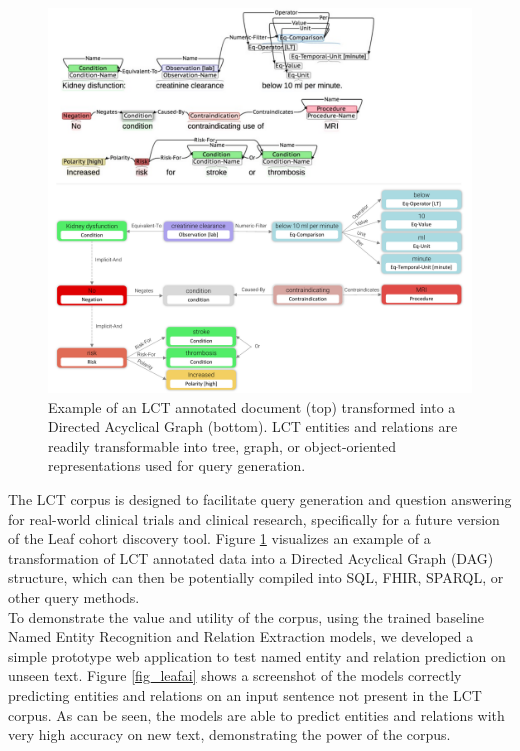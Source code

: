 \documentclass[fleqn,10pt]{wlscirep}
\begin{document}
\begin{figure}[p]
\centering
  \includegraphics[scale=0.64]{dag.pdf}  
\caption{Example of an LCT annotated document (top) transformed into a Directed Acyclical Graph (bottom). LCT entities and relations are readily transformable into tree, graph, or object-oriented representations used for query generation.}
\label{fig_dag}
\end{figure}

The LCT corpus is designed to facilitate query generation and question answering for real-world clinical trials and clinical research, specifically for a future version of the Leaf cohort discovery tool\cite{dobbins2019leaf}. Figure \ref{fig_dag} visualizes an example of a transformation of LCT annotated data into a Directed Acyclical Graph (DAG) structure, which can then be potentially compiled into SQL, FHIR, SPARQL, or other query methods. \\

\noindent To demonstrate the value and utility of the corpus, using the trained baseline Named Entity Recognition and Relation Extraction models, we developed a simple prototype web application to test named entity and relation prediction on unseen text. Figure \ref{fig_leafai} shows a screenshot of the models correctly predicting entities and relations on an input sentence not present in the LCT corpus. As can be seen, the models are able to predict entities and relations with very high accuracy on new text, demonstrating the power of the corpus. 
\end{document}
